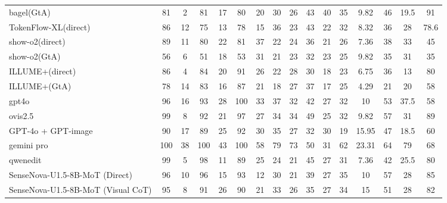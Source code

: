 \documentclass{article}
\providecommand{\rowcolor}[1]{}
\theoremstyle{plain}
\theoremstyle{definition}
\theoremstyle{remark}
\begin{document}
\begin{table}[!htbp]
{\begin{tabular}{@{}lccccccccccccccc@{}}
bagel(GtA) & 81 & 2 & 81 & 17 & 80 & 20 & 30 & 26 & 43 & 40 & 35 & 9.82 & 46 & 19.5 & 91 \\
TokenFlow-XL(direct) & 86 & 12 & 75 & 13 & 78 & 15 & 36 & 23 & 43 & 22 & 32 & 8.32 & 36 & 28 & 78.6 \\
show-o2(direct) & 89 & 11 & 80 & 22 & 81 & 37 & 22 & 24 & 36 & 21 & 26 & 7.36 & 38 & 33 & 45 \\
show-o2(GtA) & 56 & 6 & 51 & 18 & 53 & 31 & 21 & 23 & 32 & 23 & 25 & 9.82 & 35 & 31 & 35 \\
ILLUME+(direct) & 86 & 4 & 84 & 20 & 91 & 26 & 22 & 28 & 30 & 18 & 23 & 6.75 & 36 & 13 & 80 \\
ILLUME+(GtA) & 78 & 14 & 83 & 16 & 87 & 21 & 18 & 27 & 37 & 17 & 25 & 4.29 & 21 & 20 & 58 \\
\midrule
\rowcolor{orange!8}
gpt4o & 96 & 16 & 93 & 28 & 100 & 33 & 37 & 32 & 42 & 27 & 32 & 10 & 53 & 37.5 & 58 \\
ovis2.5 & 99 & 8 & 92 & 21 & 97 & 27 & 34 & 34 & 49 & 25 & 32 & 9.82 & 57 & 31 & 89 \\
\midrule
GPT-4o + GPT-image & 90 & 17 & 89 & 25 & 92 & 30 & 35 & 27 & 32 & 30 & 19 & 15.95 & 47 & 18.5 & 60 \\
gemini pro & 100 & 38 & 100 & 43 & 100 & 58 & 79 & 73 & 50 & 31 & 62 & 23.31 & 64 & 79 & 68 \\
qwenedit & 99 & 5 & 98 & 11 & 89 & 25 & 24 & 21 & 45 & 27 & 31 & 7.36 & 42 & 25.5 & 80 \\
\midrule
SenseNova-U1.5-8B-MoT (Direct) & 96 & 10 & 96 & 15 & 93 & 12 & 30 & 21 & 39 & 27 & 35 & 10 & 57 & 28 & 85 \\
SenseNova-U1.5-8B-MoT (Visual CoT) & 95 & 8 & 91 & 26 & 90 & 21 & 33 & 26 & 35 & 27 & 34 & 15 & 51 & 28 & 82 \\
\bottomrule
\end{tabular}%
}
\end{table}
\end{document}
